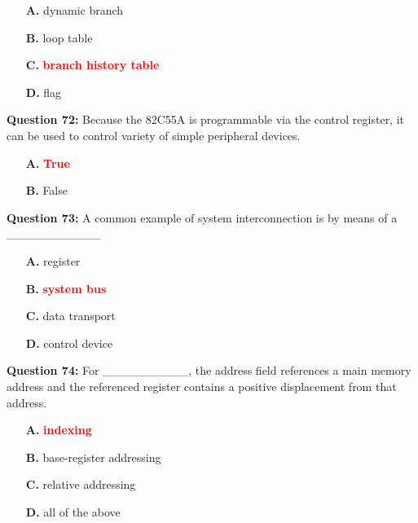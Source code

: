 \documentclass[12pt,a4paper]{article}
\begin{document}
\begin{itemize}
    \item[\textbf{A.}] dynamic branch
    \item[\textbf{B.}] loop table
    \item[\textbf{C.}] \textcolor{red}{\textbf{branch history table}}
    \item[\textbf{D.}] flag
\end{itemize}

\vspace{0.5cm}

\textbf{Question 72:} Because the 82C55A is programmable via the control register, it can be used to control variety of simple peripheral devices.

\begin{itemize}
    \item[\textbf{A.}] \textcolor{red}{\textbf{True}}
    \item[\textbf{B.}] False
\end{itemize}

\vspace{0.5cm}

\textbf{Question 73:} A common example of system interconnection is by means of a ___________

\begin{itemize}
    \item[\textbf{A.}] register
    \item[\textbf{B.}] \textcolor{red}{\textbf{system bus}}
    \item[\textbf{C.}] data transport
    \item[\textbf{D.}] control device
\end{itemize}

\vspace{0.5cm}

\textbf{Question 74:} For __________, the address field references a main memory address and the referenced register contains a positive displacement from that address.

\begin{itemize}
    \item[\textbf{A.}] \textcolor{red}{\textbf{indexing}}
    \item[\textbf{B.}] base-register addressing
    \item[\textbf{C.}] relative addressing
    \item[\textbf{D.}] all of the above
\end{itemize}

\vspace{0.5cm}
\end{document}
